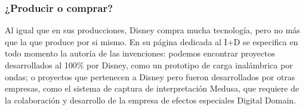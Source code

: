 \subsubsection{¿Producir o comprar?}
Al igual que en sus producciones, Disney compra mucha tecnología, pero no más que la que produce por si mismo. En su página dedicada al I+D se especifica en todo momento la autoría de las invenciones: podemos encontrar proyectos desarrollados al 100\% por Disney, como un prototipo de carga inalámbrica por ondas; o proyectos que pertenecen a Disney pero fueron desarrollados por otras empresas, como el sistema de captura de interpretación Medusa, que requiere de la colaboración y desarrollo de la empresa de efectos especiales Digital Domain.